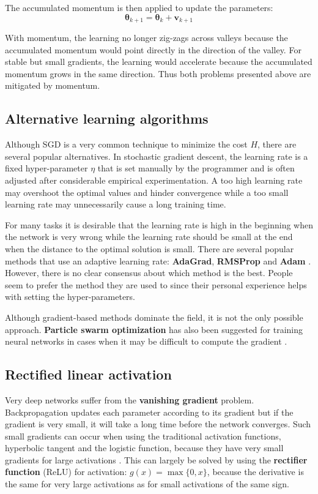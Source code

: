The accumulated momentum is then applied to update the parameters:
\[
\mathbf{\theta}_{k+1} = \mathbf{\theta}_k + \mathbf{v}_{k+1}
\]

With momentum, the learning no longer zig-zags across valleys because the accumulated momentum would point directly in the direction of the valley. For stable but small gradients, the learning would accelerate because the accumulated momentum grows in the same direction. Thus both problems presented above are mitigated by momentum.

\subsection{Alternative learning algorithms}

Although SGD is a very common technique to minimize the cost $H$, there are several popular alternatives. In stochastic gradient descent, the learning rate is a fixed hyper-parameter $\eta$ that is set manually by the programmer and is often adjusted after considerable empirical experimentation. A too high learning rate may overshoot the optimal values and hinder convergence while a too small learning rate may unnecessarily cause a long training time.

For many tasks it is desirable that the learning rate is high in the beginning when the network is very wrong while the learning rate should be small at the end when the distance to the optimal solution is small. There are several popular methods that use an adaptive learning rate: \textbf{AdaGrad}, \textbf{RMSProp} and \textbf{Adam} \cite[Chapter~8.5]{GoodfellowBook}. However, there is no clear consensus about which method is the best. People seem to prefer the method they are used to since their personal experience helps with setting the hyper-parameters.

Although gradient-based methods dominate the field, it is not the only possible approach. \textbf{Particle swarm optimization} has also been suggested for training neural networks in cases when it may be difficult to compute the gradient \cite[Chapter~5]{StochasticOpt}.

\subsection{Rectified linear activation}

Very deep networks suffer from the \textbf{vanishing gradient} problem.
Backpropagation updates each parameter according to its gradient but if the gradient is very small, it will take a long time before the network converges.
Such small gradients can occur when using the traditional activation functions, hyperbolic tangent and the logistic function, because they have very small gradients for large activations \cite{AlexNet}.
This can largely be solved by using the \textbf{rectifier function} (ReLU) for activation: $g(x) = \max \{0, x\}$, because the derivative is the same for very large activations as for small activations of the same sign.


